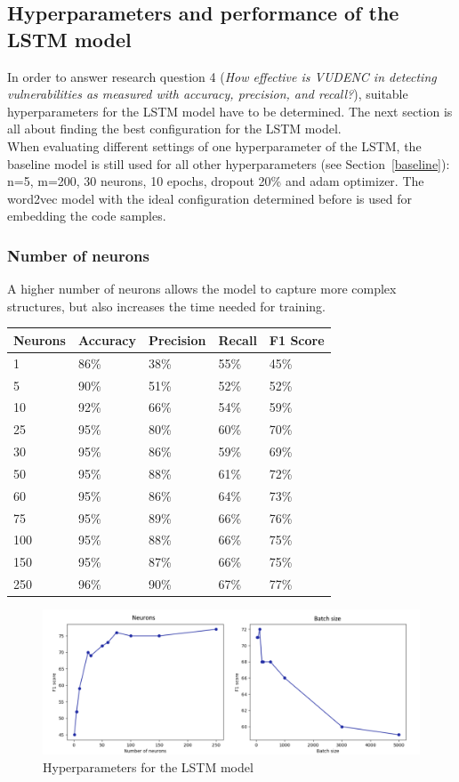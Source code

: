 \documentclass[
a4paper,
pagesize,
pdftex,
12pt,
twoside, %
BCOR=5mm, %
ngerman,
fleqn,
final,
]{scrartcl}
\begin{document}
	\subsection{Hyperparameters and performance of the LSTM model}
	
	In order to answer research question 4 (\textit{How effective is VUDENC in detecting vulnerabilities as measured with accuracy, precision, and recall?}), suitable hyperparameters for the LSTM model have to be determined. The next section is all about finding the best configuration for the LSTM model. \\	
	When evaluating different settings of one hyperparameter of the LSTM, the baseline model is still used for all other hyperparameters (see Section~\ref{baseline}): n=5, m=200, 30 neurons, 10 epochs, dropout 20\% and adam optimizer. The word2vec model with the ideal configuration determined before is used for embedding the code samples.

	\subsubsection{Number of neurons}
	A higher number of neurons allows the model to capture more complex structures, but also increases the time needed for training.
	
	\begin{tabular}{ | p{2cm} || p{2cm}|p{2cm}|p{2cm}|p{2cm}|  }
		\hline
		Neurons & Accuracy & Precision & Recall & F1 Score \\
		\hline
		1 & 86\% & 38\% & 55\% & 45\% \\
		5 & 90\% &  51\% &  52\% &  52\% \\
		10 & 92\% &  66\% &  54\% &  59\% \\
		25 & 95\% &  80\% &  60\% &  70\% \\
		30 & 95\% &  86\% &  59\% &  69\% \\
		50 & 95\% &  88\% &  61\% &  72\% \\
		60 & 95\% &  86\% &  64\% &  73\%\\
		75 & 95\% &  89\% &  66\% &  76\% \\
		100 & 95\% &  88\% &  66\% &  75\% \\
		150 & 95\% &  87\% &  66\% &  75\% \\
		250 & 96\% &  90\% &  67\% &  77\% \\
		\hline
		\hline

	\end{tabular}
			\begin{figure}[h]
		\centering
		\includegraphics[width=1\textwidth]{img/hyper1}
		\caption{Hyperparameters for the LSTM model}
		\label{fig:hyper1}
	\end{figure}
\end{document}

